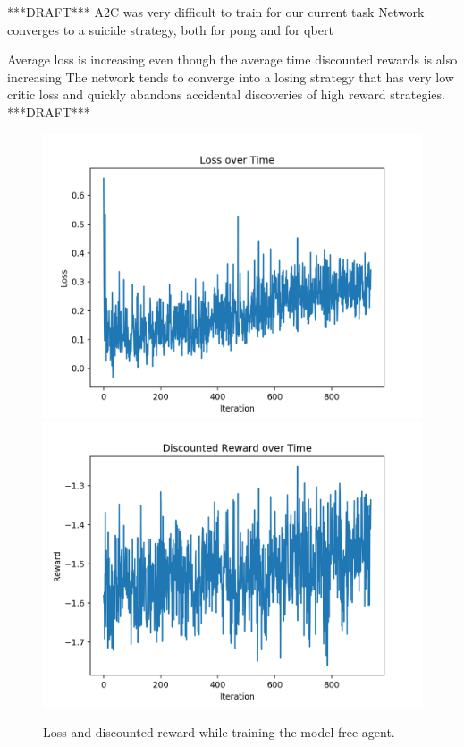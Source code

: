 \documentclass[10pt, twocolumn]{article}
\begin{document}
***DRAFT***
A2C was very difficult to train for our current task
Network converges to a suicide strategy, both for pong and for qbert

Average loss is increasing even though the average time discounted rewards is also increasing
The network tends to converge into a losing strategy that has very low critic loss and quickly abandons accidental discoveries of high reward strategies.
***DRAFT***


\begin{figure}[h]
\centering
\includegraphics[scale=0.4]{losses}
\includegraphics[scale=0.4]{rewards}
\caption{Loss and discounted reward while training the model-free agent.}
\label{plots}
\end{figure}
\end{document}
